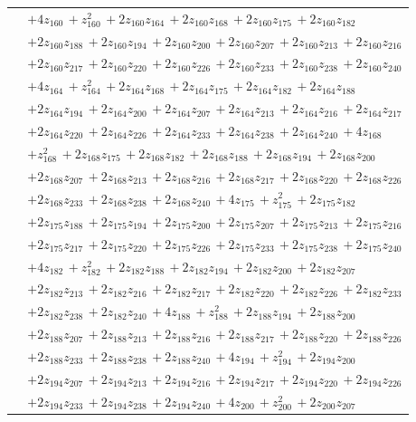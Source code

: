 \begin{longtable}{@{}r p{0.88\linewidth}@{}}
 & $+4z_{160}\,+z_{160}^{2}\,+2z_{160}z_{164}\,+2z_{160}z_{168}\,+2z_{160}z_{175}\,+2z_{160}z_{182}$\\
 & $+2z_{160}z_{188}\,+2z_{160}z_{194}\,+2z_{160}z_{200}\,+2z_{160}z_{207}\,+2z_{160}z_{213}\,+2z_{160}z_{216}$\\
 & $+2z_{160}z_{217}\,+2z_{160}z_{220}\,+2z_{160}z_{226}\,+2z_{160}z_{233}\,+2z_{160}z_{238}\,+2z_{160}z_{240}$\\
 & $+4z_{164}\,+z_{164}^{2}\,+2z_{164}z_{168}\,+2z_{164}z_{175}\,+2z_{164}z_{182}\,+2z_{164}z_{188}$\\
 & $+2z_{164}z_{194}\,+2z_{164}z_{200}\,+2z_{164}z_{207}\,+2z_{164}z_{213}\,+2z_{164}z_{216}\,+2z_{164}z_{217}$\\
 & $+2z_{164}z_{220}\,+2z_{164}z_{226}\,+2z_{164}z_{233}\,+2z_{164}z_{238}\,+2z_{164}z_{240}\,+4z_{168}$\\
 & $+z_{168}^{2}\,+2z_{168}z_{175}\,+2z_{168}z_{182}\,+2z_{168}z_{188}\,+2z_{168}z_{194}\,+2z_{168}z_{200}$\\
 & $+2z_{168}z_{207}\,+2z_{168}z_{213}\,+2z_{168}z_{216}\,+2z_{168}z_{217}\,+2z_{168}z_{220}\,+2z_{168}z_{226}$\\
 & $+2z_{168}z_{233}\,+2z_{168}z_{238}\,+2z_{168}z_{240}\,+4z_{175}\,+z_{175}^{2}\,+2z_{175}z_{182}$\\
 & $+2z_{175}z_{188}\,+2z_{175}z_{194}\,+2z_{175}z_{200}\,+2z_{175}z_{207}\,+2z_{175}z_{213}\,+2z_{175}z_{216}$\\
 & $+2z_{175}z_{217}\,+2z_{175}z_{220}\,+2z_{175}z_{226}\,+2z_{175}z_{233}\,+2z_{175}z_{238}\,+2z_{175}z_{240}$\\
 & $+4z_{182}\,+z_{182}^{2}\,+2z_{182}z_{188}\,+2z_{182}z_{194}\,+2z_{182}z_{200}\,+2z_{182}z_{207}$\\
 & $+2z_{182}z_{213}\,+2z_{182}z_{216}\,+2z_{182}z_{217}\,+2z_{182}z_{220}\,+2z_{182}z_{226}\,+2z_{182}z_{233}$\\
 & $+2z_{182}z_{238}\,+2z_{182}z_{240}\,+4z_{188}\,+z_{188}^{2}\,+2z_{188}z_{194}\,+2z_{188}z_{200}$\\
 & $+2z_{188}z_{207}\,+2z_{188}z_{213}\,+2z_{188}z_{216}\,+2z_{188}z_{217}\,+2z_{188}z_{220}\,+2z_{188}z_{226}$\\
 & $+2z_{188}z_{233}\,+2z_{188}z_{238}\,+2z_{188}z_{240}\,+4z_{194}\,+z_{194}^{2}\,+2z_{194}z_{200}$\\
 & $+2z_{194}z_{207}\,+2z_{194}z_{213}\,+2z_{194}z_{216}\,+2z_{194}z_{217}\,+2z_{194}z_{220}\,+2z_{194}z_{226}$\\
 & $+2z_{194}z_{233}\,+2z_{194}z_{238}\,+2z_{194}z_{240}\,+4z_{200}\,+z_{200}^{2}\,+2z_{200}z_{207}$\\

\end{longtable}
